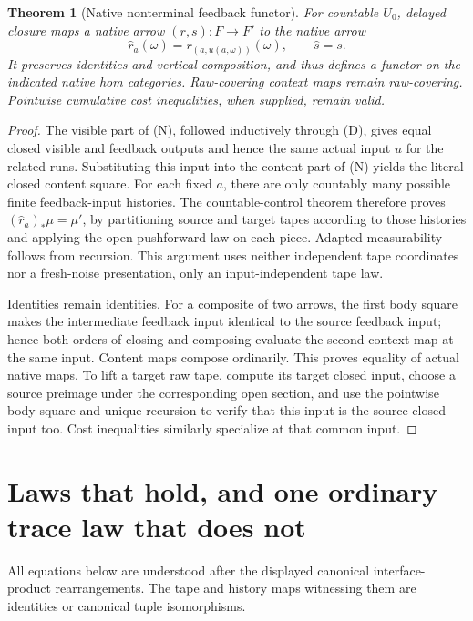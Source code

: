 \documentclass[11pt]{article}
\newtheorem{theorem}{Theorem}[section]
\begin{document}
\begin{theorem}[Native nonterminal feedback functor]\label{writerfeedback:functor}
For countable $U_0$, delayed closure maps a native arrow $(r,s):F\to F'$ to the native arrow
\[
 \widehat r_a(\omega)=r_{(a,u(a,\omega))}(\omega),\qquad \widehat s=s.
\]
It preserves identities and vertical composition, and thus defines a functor on the indicated native hom categories. Raw-covering context maps remain raw-covering. Pointwise cumulative cost inequalities, when supplied, remain valid.
\end{theorem}
\begin{proof}
The visible part of (N), followed inductively through (D), gives equal closed visible and feedback outputs and hence the same actual input $u$ for the related runs. Substituting this input into the content part of (N) yields the literal closed content square. For each fixed $a$, there are only countably many possible finite feedback-input histories. The countable-control theorem therefore proves $(\widehat r_a)_*\mu=\mu'$, by partitioning source and target tapes according to those histories and applying the open pushforward law on each piece. Adapted measurability follows from recursion. This argument uses neither independent tape coordinates nor a fresh-noise presentation, only an input-independent tape law.

Identities remain identities. For a composite of two arrows, the first body square makes the intermediate feedback input identical to the source feedback input; hence both orders of closing and composing evaluate the second context map at the same input. Content maps compose ordinarily. This proves equality of actual native maps. To lift a target raw tape, compute its target closed input, choose a source preimage under the corresponding open section, and use the pointwise body square and unique recursion to verify that this input is the source closed input too. Cost inequalities similarly specialize at that common input.
\end{proof}

\section{Laws that hold, and one ordinary trace law that does not}
All equations below are understood after the displayed canonical interface-product rearrangements. The tape and history maps witnessing them are identities or canonical tuple isomorphisms.
\end{document}
